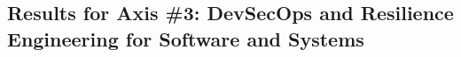  
 







\subsection{Results for Axis \#3: DevSecOps and Resilience Engineering for Software and Systems}
\label{resultats:results-axis3}


\begin{participants}
\end{participants}

